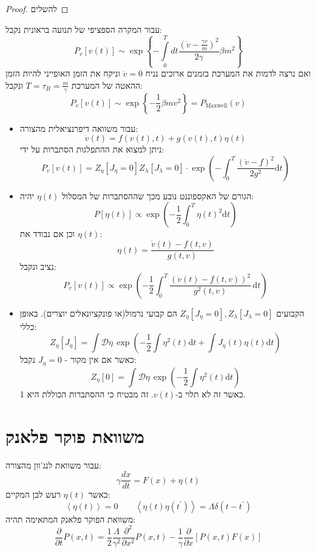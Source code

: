\documentclass{tstextbook}
\begin{document}
\begin{proof}
להשלים

\end{proof}
\begin{example}
עבור המקרה הספציפי של תנועה בראונית נקבל:
$$P_{v}\left[v\left(t\right)\right]\sim\exp\left\{-\int\limits_{0}^{T}d t\frac{\left(\dot{v}-\frac{\gamma v}{m}\right)^{2}}{2\gamma}\beta m^{2}\right\}$$
ואם נרצה לדמות את המערכת בזמנים ארוכים נניח \(\dot{v}=0\) וניקח את הזמן האופייני להיות הזמן ההאטה של המערכת \(T=\tau_{B}=\frac{m}{\gamma}\) ונקבל:
$$P_{v}\left[v\left(t\right)\right]\sim\exp\left\{-{\frac{1}{2}}\beta m v^{2}\right\}=P_{\mathrm{Maxwell}}\left(v\right)$$

\end{example}
\begin{summary}
  \begin{itemize}
    \item עבור משוואה דיפרנציאלית מהצורה:
$${\dot{v}}(t)=f(v(t),t)+g(v(t),t)\eta(t)$$
ניתן למצוא את ההתפלגות הסתברות על ידי:
$$P_{v}[v(t)]=Z_{\eta}[J_{\eta}=0]Z_{\lambda}[J_{\lambda}=0]\cdot\exp\left(-\int_{0}^{T}{\frac{(\dot{v}-f)^{2}}{2g^{2}}}\mathrm{d}t\right)$$
    \item הגורם של האקספוננט נובע מכך שההסתברות של המסלול \(\eta(t)\) יהיה:
$$P[\eta(t)]\propto\exp\left(-\frac{1}{2}\int_{0}^{T}\eta(t)^{2}\mathrm{d}t\right)$$
וכן אם נבודד את \(\eta(t)\):
$$\eta(t)={\frac{\dot{v}(t)-f(t,v)}{g(t,v)}}$$
נציב ונקבל:
$$P_{v}[v(t)]\propto\exp\left(-\frac{1}{2}\int_{0}^{T}\frac{(\dot{v}(t)-f(t,v))^{2}}{g^{2}(t,v)}\,\mathrm{d}t\right)$$
    \item הקבועים \(Z_{\eta}\left[ J_{\eta}=0 \right],Z_{\lambda}\left[ J_{\lambda}=0 \right]\) הם קבועי נרמול(או פונקציונאלים יוצרים). באופן כללי:
$$Z_{\eta}[J_{\eta}]=\int{\mathcal{D}}\eta\,\exp\left(-{\frac{1}{2}}\int\eta^{2}(t)\mathrm{d}t+\int J_{\eta}(t)\eta(t)\mathrm{d}t\right)$$
כאשר אם אין מקור - \(J_{\eta}=0\) נקבל:
$$Z_{\eta}[0]=\int{\mathcal{D}}\eta\,\exp\left(-{\frac{1}{2}}\int\eta^{2}(t)\mathrm{d}t\right)$$
כאשר זה לא תלוי ב-\(v(t)\). זה מבטיח כי ההסתברות הכוללת היא 1.
  \end{itemize}
\end{summary}
\section{משוואת פוקר פלאנק}

עבור משוואת לנג'וון מהצורה:
$$\gamma\frac{d x}{d t}=F\left(x\right)+\eta\left(t\right)$$
כאשר \(\eta(t)\) רעש לבן המקיים:
$$\left\langle\eta\left(t\right)\right\rangle=0\qquad\left\langle\eta\left(t\right)\eta\left(t^{\prime}\right)\right\rangle=\Lambda\delta\left(t-t^{\prime}\right)$$
משוואת הפוקר פלאנק המתאימה תהיה:
$$\frac{\partial}{\partial t}P\left(x,t\right)=\frac{1}{2}\frac{\Lambda}{\gamma^{2}}\frac{\partial^{2}}{\partial x^{2}}P\left(x,t\right)-\frac{1}{\gamma}\frac{\partial}{\partial x}\left[P\left(x,t\right)F\left(x\right)\right]$$
\end{document}
